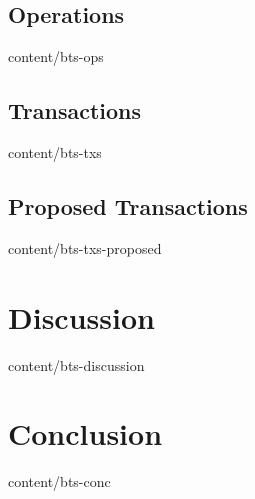 \documentclass[unpublished]{btswhitepaper}
\begin{document}
\subsection    { Operations                        }  { content/bts-ops             } 
\subsection    { Transactions                      }  { content/bts-txs             } 
\subsection    { Proposed Transactions             }  { content/bts-txs-proposed    }

\section       { Discussion                        }  { content/bts-discussion      } 

\section       { Conclusion                        }  { content/bts-conc            } 




\end{document}
